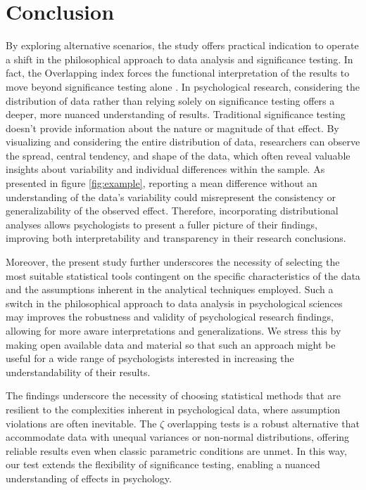 \documentclass[twocolumn]{article}\usepackage[]{graphicx}\usepackage[]{xcolor}
\begin{document}
\section{Conclusion}

By exploring alternative scenarios, the study offers practical indication to operate a shift in the philosophical approach to data analysis and significance testing. In fact, the Overlapping index forces the functional interpretation of the results to move beyond significance testing alone \cite{pastore2018overlapping, steegen2016increasing, gelman2018failure}. In psychological research, considering the distribution of data rather than relying solely on significance testing offers a deeper, more nuanced understanding of results. Traditional significance testing doesn't provide information about the nature or magnitude of that effect. By visualizing and considering the entire distribution of data, researchers can observe the spread, central tendency, and shape of the data, which often reveal valuable insights about variability and individual differences within the sample.  As presented in figure \ref{fig:example}, reporting a mean difference without an understanding of the data's variability could misrepresent the consistency or generalizability of the observed effect. Therefore, incorporating distributional analyses allows psychologists to present a fuller picture of their findings, improving both interpretability and transparency in their research conclusions. 

Moreover, the present study further underscores the necessity of selecting the most suitable statistical tools contingent on the specific characteristics of the data and the assumptions inherent in the analytical techniques employed. Such a switch in the philosophical approach to data analysis in psychological sciences \cite{vasishth2021embrace} may improves the robustness and validity of psychological research findings, allowing for more aware interpretations and generalizations. We stress this by making open available data and material so that such an approach might be useful for a wide range of psychologists interested in increasing the understandability of their results. 

The findings underscore the necessity of choosing statistical methods that are resilient to the complexities inherent in psychological data, where assumption violations are often inevitable. The $\zeta$ overlapping tests is a robust alternative that accommodate data with unequal variances or non-normal distributions, offering reliable results even when classic parametric conditions are unmet. In this way, our test extends the flexibility of significance testing, enabling a nuanced understanding of effects in psychology.
\end{document}
